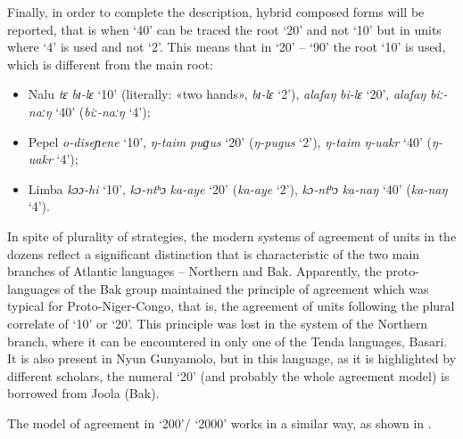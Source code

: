 Finally, in order to complete the description, hybrid composed forms will be reported, that is when `40' can be traced the root `20' and not `10' but in units where `4' is used and not `2'. This means that in ‘20’ – ‘90’ the root ‘10’ is used, which is different from the main root: 

\begin{itemize}
\item Nalu \textit{tɛ} \textit{bɪ-lɛ} ‘10’ (literally: «two hands», \textit{bɪ-lɛ} ‘2’), \textit{alafaŋ} \textit{bi-lɛ} ‘20’, \textit{alafaŋ} \textit{biː-naːŋ} ‘40’ (\textit{biː-naːŋ} ‘4’); 
\item Pepel \textit{o-diseɲene} ‘10’, \textit{ŋ-taim} \textit{puɡus} ‘20’ (\textit{ŋ-pugus} ‘2’), \textit{ŋ-taim} \textit{ŋ-uakr} ‘40’ (\textit{ŋ-uakr} ‘4’);
\item Limba \textit{kɔɔ-hi} ‘10’, \textit{kɔ-ntʰɔ} \textit{ka-aye} ‘20’ (\textit{ka-aye} ‘2’), \textit{kɔ-ntʰɔ} \textit{ka-naŋ} ‘40’ (\textit{ka-naŋ} ‘4’). 
\end{itemize}

In spite of plurality of strategies, the modern systems of agreement of units in the dozens reflect a significant distinction that is characteristic of the two main branches of Atlantic languages – Northern and Bak. Apparently, the proto-languages of the Bak group maintained the principle of agreement which was typical for Proto-Niger-Congo, that is, the agreement of units following the plural correlate of ‘10’ or ‘20’. This principle was lost in the system of the Northern branch, where it can be encountered in only one of the Tenda languages, Basari. It is also present in Nyun Gunyamolo, but in this language, as it is highlighted by different scholars, the numeral ‘20’ (and probably the whole agreement model) is borrowed from Joola (Bak). 

The model of agreement in ‘200’/ ‘2000’ works in a similar way, as shown in . 



